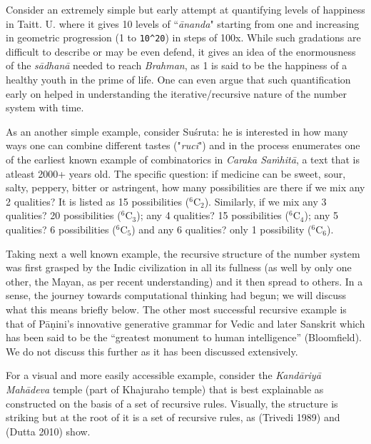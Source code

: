 Consider an extremely simple but early attempt at quantifying levels of happiness in Taitt. U. where it gives 10 levels of “\textsl{ānanda}" starting from one and increasing in geometric progression (1 to \verb|10^20|) in steps of 100x. While such gradations are difficult to describe or may be even defend, it gives an idea of the enormousness of the \textsl{sādhanā} needed to reach \textsl{Brahman}, as 1 is said to be the happiness of a healthy youth in the prime of life. One can even argue that such quantification early on helped in understanding the iterative/recursive nature of the number system with time.

As an another simple example, consider Suśruta: he is interested in how many ways one can combine different tastes ("\textsl{ruci}") and in the process enumerates one of the earliest known example of combinatorics in \textsl{Caraka Saṁhitā}, a text that is atleast 2000+ years old. The specific question: if medicine can be sweet, sour, salty, peppery, bitter or astringent, how many possibilities are there if we mix any 2 qualities? It is listed as 15 possibilities ($^{6}$C$_{2}$). Similarly, if we mix any 3 qualities? 20 possibilities ($^{6}$C$_{3}$); any 4 qualities? 15 possibilities ($^{6}$C$_{4}$); any 5 qualities? 6 possibilities ($^{6}$C$_{5}$) and any 6 qualities? only 1 possibility ($^{6}$C$_{6}$).

Taking next a well known example, the recursive structure of the number system was first grasped by the Indic civilization in all its fullness (as well by only one other, the Mayan, as per recent understanding) and it then spread to others. In a sense, the journey towards computational thinking had begun; we will discuss what this means briefly below. The other most successful recursive example is that of Pāṇini’s innovative generative grammar for Vedic and later Sanskrit which has been said to be the “greatest monument to human intelligence” (Bloomfield). We do not discuss this further as it has been discussed extensively.

For a visual and more easily accessible example, consider the \textsl{Kandāriyā Mahādeva} temple (part of Khajuraho temple) that is best explainable as constructed on the basis of a set of recursive rules. Visually, the structure is striking but at the root of it is a set of recursive rules, as (Trivedi 1989) and (Dutta 2010) show.

